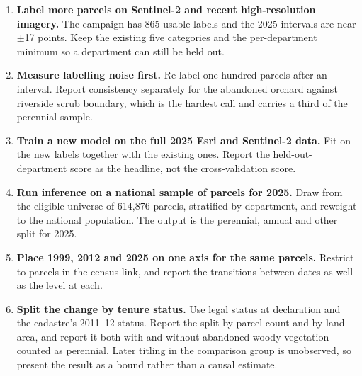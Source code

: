 \documentclass[11pt,a4paper]{article}
\begin{document}
\begin{enumerate}[leftmargin=1.5em,itemsep=3pt]
\item \textbf{Label more parcels on Sentinel-2 and recent high-resolution imagery.} The campaign
has 865 usable labels and the 2025 intervals are near $\pm$17 points. Keep the existing five
categories and the per-department minimum so a department can still be held out.

\item \textbf{Measure labelling noise first.} Re-label one hundred parcels after an interval.
Report consistency separately for the abandoned orchard against riverside scrub boundary, which is
the hardest call and carries a third of the perennial sample.

\item \textbf{Train a new model on the full 2025 Esri and Sentinel-2 data.} Fit on the new labels
together with the existing ones. Report the held-out-department score as the headline, not the
cross-validation score.

\item \textbf{Run inference on a national sample of parcels for 2025.} Draw from the eligible
universe of 614{,}876 parcels, stratified by department, and reweight to the national population.
The output is the perennial, annual and other split for 2025.

\item \textbf{Place 1999, 2012 and 2025 on one axis for the same parcels.} Restrict to parcels in
the census link, and report the transitions between dates as well as the level at each.

\item \textbf{Split the change by tenure status.} Use legal status at declaration and the
cadastre's 2011--12 status. Report the split by parcel count and by land area, and report it both
with and without abandoned woody vegetation counted as perennial. Later titling in the comparison
group is unobserved, so present the result as a bound rather than a causal estimate.
\end{enumerate}
\end{document}
